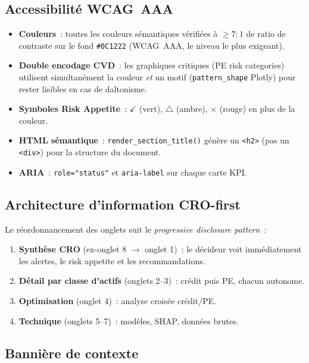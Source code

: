 \documentclass[12pt,a4paper]{article}
\begin{document}
\subsection{Accessibilit\'e WCAG~AAA}

\begin{itemize}[leftmargin=2em]
    \item \textbf{Couleurs}~: toutes les couleurs s\'emantiques v\'erifi\'ees \`a $\geq 7{:}1$ de ratio de contraste sur le fond \texttt{\#0C1222} (WCAG~AAA, le niveau le plus exigeant).
    \item \textbf{Double encodage CVD}~: les graphiques critiques (PE risk categories) utilisent simultan\'ement la couleur \emph{et} un motif (\texttt{pattern\_shape} Plotly) pour rester lisibles en cas de daltonisme.
    \item \textbf{Symboles Risk Appetite}~: $\checkmark$ (vert), $\triangle$ (ambre), $\times$ (rouge) en plus de la couleur.
    \item \textbf{HTML s\'emantique}~: \texttt{render\_section\_title()} g\'en\`ere un \texttt{<h2>} (pas un \texttt{<div>}) pour la structure du document.
    \item \textbf{ARIA}~: \texttt{role="status"} et \texttt{aria-label} sur chaque carte KPI.
\end{itemize}

\subsection{Architecture d'information CRO-first}

Le r\'eordonnancement des onglets suit le \emph{progressive disclosure pattern}~:

\begin{enumerate}[leftmargin=2em]
    \item \textbf{Synth\`ese CRO} (ex-onglet 8 $\to$ onglet 1)~: le d\'ecideur voit imm\'ediatement les alertes, le risk appetite et les recommandations.
    \item \textbf{D\'etail par classe d'actifs} (onglets 2--3)~: cr\'edit puis PE, chacun autonome.
    \item \textbf{Optimisation} (onglet 4)~: analyse crois\'ee cr\'edit/PE.
    \item \textbf{Technique} (onglets 5--7)~: mod\`eles, SHAP, donn\'ees brutes.
\end{enumerate}

\subsection{Banni\`ere de contexte}
\end{document}
